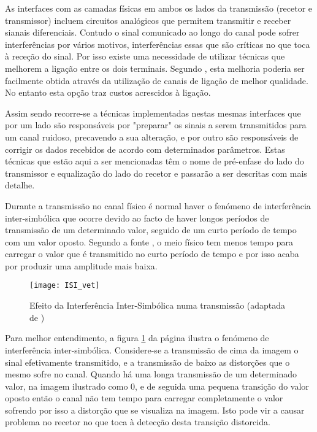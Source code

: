 As interfaces com as camadas físicas em ambos os lados da transmissão (recetor e transmissor) incluem circuitos analógicos que permitem transmitir e receber sianais diferenciais. Contudo o sinal comunicado ao longo do canal pode sofrer interferências por vários motivos, interferências essas que são críticas no que toca à receção do sinal. Por isso existe uma necessidade de utilizar técnicas que melhorem a ligação entre os dois terminais. Segundo \cite{R012}, esta melhoria poderia ser facilmente obtida através da utilização de canais de ligação de melhor qualidade. No entanto esta opção traz custos acrescidos à ligação. 

Assim sendo recorre-se a técnicas implementadas nestas mesmas interfaces que por um lado são responsáveis por "preparar" os sinais a serem transmitidos para um canal ruidoso, precavendo a sua alteração, e por outro são responsáveis de corrigir os dados recebidos de acordo com determinados parâmetros. Estas técnicas que estão aqui a ser mencionadas têm o nome de pré-enfase do lado do transmissor e equalização do lado do recetor e passarão a ser descritas com mais detalhe.

Durante a transmissão no canal físico é normal haver o fenómeno de interferência inter-simbólica que ocorre devido ao facto de haver longos períodos de transmissão de um determinado valor, seguido de um curto período de tempo com um valor oposto. Segundo a fonte \cite{R032}, o meio físico tem menos tempo para carregar o valor que é transmitido no curto período de tempo e por isso acaba por produzir uma amplitude mais baixa.
\begin{figure}[h!]
	\begin{center}
		\leavevmode
		\texttt{[image: ISI\_vet]}
		\caption[Efeito da Interferência Inter-Simbólica numa transmissão]{Efeito da Interferência Inter-Simbólica numa transmissão (adaptada de \cite{R032})}
		\label{fig:isi}
	\end{center}
\end{figure}
Para melhor entendimento, a figura \ref{fig:isi} da página \pageref{fig:isi} ilustra o fenómeno de interferência inter-simbólica. Considere-se a transmissão de cima da imagem o sinal efetivamente transmitido, e a transmissão de baixo as distorções que o mesmo sofre no canal. Quando há uma longa transmissão de um determinado valor, na imagem ilustrado como 0, e de seguida uma pequena transição do valor oposto então o canal não tem tempo para carregar completamente o valor sofrendo por isso a distorção que se visualiza na imagem. Isto pode vir a causar problema no recetor no que toca à detecção desta transição distorcida.


